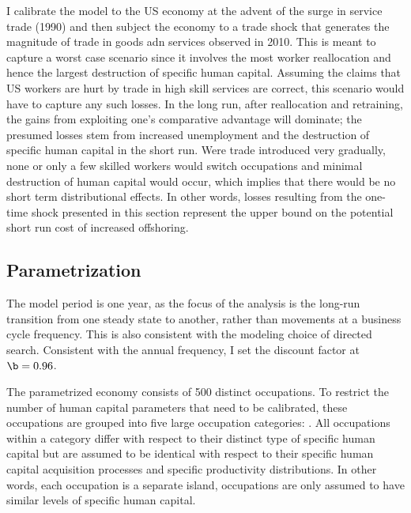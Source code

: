 \documentclass[12pt]{article}
\newcommand{\highlightO}[1]{{\emph{\color{MyOrange}{#1}}}}
\theoremstyle{definition}
\begin{document}
I calibrate the model to the US economy at the advent of the surge in service trade (1990) and then subject the economy to a trade shock that generates the magnitude of trade in goods adn services observed in 2010. \highlightO{In order to obtain the greatest possible short run effect, the full magnitude of the trade shock is assumed to hit the economy at once.} This is meant to capture a worst case scenario since it involves the most worker reallocation and hence the largest destruction of specific human capital. Assuming the claims that US workers are hurt by trade in high skill services are correct, this scenario would have to capture any such losses. In the long run, after reallocation and retraining, the gains from exploiting one's comparative advantage will dominate; the presumed losses stem from increased unemployment and the destruction of specific human capital in the short run. Were trade introduced very gradually, none or only a few skilled workers would switch occupations and minimal destruction of human capital would occur, which implies that there would be no short term distributional effects. In other words, losses resulting from the one-time shock presented in this section represent the upper bound on the potential short run cost of increased offshoring.

\subsection{Parametrization}

The model period is one year, as the focus of the analysis is the long-run transition from one steady state to another, rather than movements at a business cycle frequency. This is also consistent with the modeling choice of directed search. Consistent with the annual frequency, I set the discount factor at $\b = 0.96$. 

The parametrized economy consists of 500 distinct occupations. To restrict the number of human capital parameters that need to be calibrated, these occupations are grouped into five large occupation categories: \highlightO{tradable high/low psecific skill services, non-tradable high and low specific skill services, and tradable production occupations}. All occupations within a category differ with respect to their distinct type of specific human capital but are assumed to be identical with respect to their specific human capital acquisition processes and specific productivity distributions. In other words, each occupation is a separate island, occupations are only assumed to have similar levels of specific human capital. 
\end{document}
